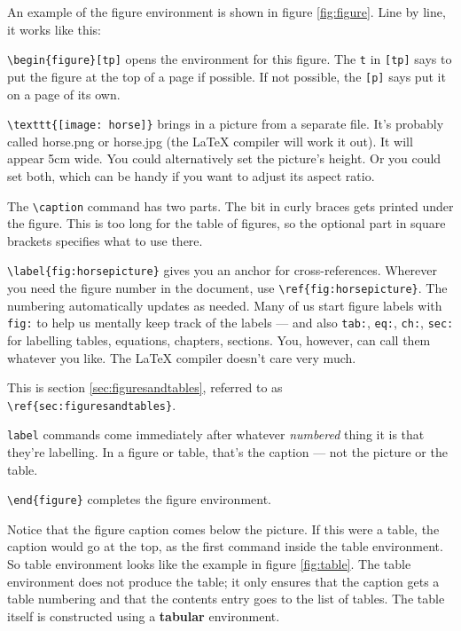 An example of the figure environment is shown in figure \ref{fig:figure}. Line by line, it works like this:
\begin{description}
	\item{\verb+\begin{figure}[tp]+} opens the environment for this figure. The \verb+t+ in \verb+[tp]+ says to put the figure at the top of a page if possible. If not possible, the \verb+[p]+ says put it on a page of its own.
	\item{\verb+\texttt{[image: horse]}+} brings in a picture from a separate file. It's probably called horse.png or horse.jpg (the LaTeX compiler will work it out). It will appear 5cm wide. You could alternatively set the picture's height. Or you could set both, which can be handy if you want to adjust its aspect ratio.
	\item {The \verb+\caption+ command} has two parts. The bit in curly braces gets printed under the figure. This is too long for the table of figures, so the optional part in square brackets specifies what to use there. 
	\item {\verb+\label{fig:horsepicture}+} gives you an anchor for cross-references. Wherever you need the figure number in the document, use \verb+\ref{fig:horsepicture}+. The numbering automatically updates as needed. Many of us start figure labels with \texttt{fig:} to help us mentally keep track of the labels — and also \texttt{tab:}, \texttt{eq:}, \texttt{ch:}, \texttt{sec:} for labelling tables, equations, chapters, sections.  You, however, can call them whatever you like. The LaTeX compiler doesn't care very much.
	
	This is section \ref{sec:figuresandtables}, referred to as \verb+\ref{sec:figuresandtables}+.
	
	\texttt{label} commands come immediately after whatever \emph{numbered} thing it is that they're labelling. In a figure or table, that's the caption — not the picture or the table.
	\item{\verb+\end{figure}+} completes the figure environment.
\end{description}

Notice that the figure caption comes below the picture. If this were a table, the caption would go at the top, as the first command inside the table environment. So table environment looks like the example in figure \ref{fig:table}. The table environment does not produce the table; it only ensures that the caption gets a table numbering and that the contents entry goes to the list of tables. The table itself is constructed using a \textbf{tabular} environment.


